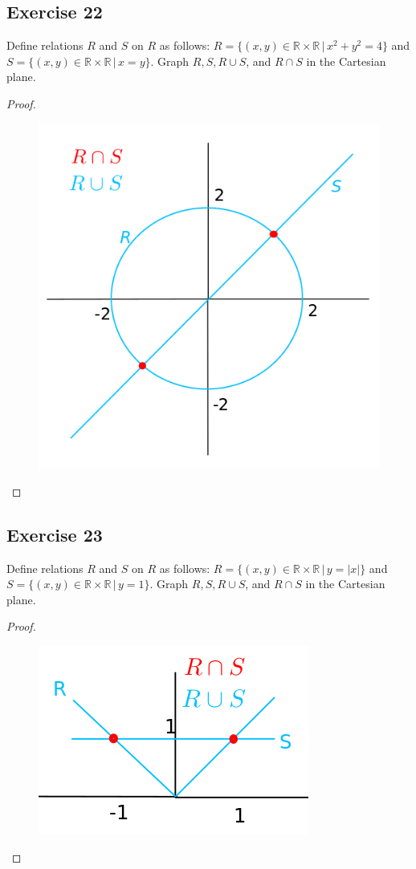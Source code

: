 \documentclass[14pt]{extarticle}
\newcommand{\R}{\mathbb{R}}
\begin{document}
\subsection{Exercise 22}
Define relations $R$ and $S$ on $R$ as follows: \(R = \{(x, y) \in \R \times \R \, | \, x^2 + y^2 = 4\}\) and 
\(S = \{(x, y) \in \R \times \R \, | \, x = y\}\). Graph \(R, S, R \cup S\), and \(R \cap S\) in the Cartesian plane.

\begin{proof}
\begin{figure}[ht!]
\centering
\includegraphics[scale=0.3]{../images/8.1.22.png}
\end{figure}
\end{proof}

\subsection{Exercise 23}
Define relations $R$ and $S$ on $R$ as follows: \(R = \{(x, y) \in \R \times \R \, | \, y = |x|\}\) and 
\(S = \{(x, y) \in \R \times \R \, | \, y = 1\}\). Graph \(R, S, R \cup S\), and \(R \cap S\) in the Cartesian plane.

\begin{proof}
\begin{figure}[ht!]
\centering
\includegraphics[scale=0.35]{../images/8.1.23.png}
\end{figure}
\end{proof}
\end{document}

